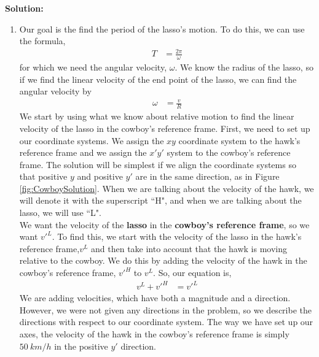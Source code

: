 \textbf{Solution:}
\begin{enumerate}[label=\alph*)]
\item Our goal is the find the period of the lasso's motion. To do this, we can use the formula, 
\begin{align*}
T&=\frac{2\pi}{\omega}
\end{align*}
for which we need the angular velocity, $\omega$. We know the radius of the lasso, so if we find the linear velocity of the end point of the lasso, we can find the angular velocity by
\begin{align*}
\omega&=\frac{v}{R}
\end{align*}
We start by using what we know about relative motion to find the linear velocity of the lasso in the cowboy's reference frame. First, we need to set up our coordinate systems. We assign the $xy$ coordinate system to the hawk's reference frame and we assign the $x'y'$ system to the cowboy's reference frame. The solution will be simplest if we align the coordinate systems so that positive $y$ and positive $y'$ are in the same direction, as in Figure \ref{fig:CowboySolution}. When we are talking about the velocity of the hawk, we will denote it with the superscript ``H", and when we are talking about the lasso, we will use ``L".\\

We want the velocity of the \textbf{lasso} in the \textbf{cowboy's reference frame}, so we want $v'^L$. To find this, we start with the velocity of the lasso in the hawk's reference frame,$v^L$ and then take into account that the hawk is moving relative to the cowboy. We do this by adding the velocity of the hawk in the cowboy's reference frame, $v'^H$ to $v^L$. So, our equation is,
\begin{align*}
v^L+v'^H&=v'^L
\end{align*}
We are adding velocities, which have both a magnitude and a direction. However, we were not given any directions in the problem, so we describe the directions with respect to our coordinate system. The way we have set up our axes, the velocity of the hawk in the cowboy's reference frame is simply $\SI{50}{km/h}$ in the positive $y'$ direction.\\


\end{enumerate}

